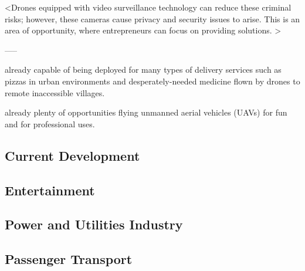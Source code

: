 <Drones equipped with video surveillance technology can reduce these criminal risks; however, these cameras cause privacy and security issues to arise. This is an area of opportunity, where entrepreneurs can focus on providing solutions. >

-----


already capable of being deployed for many types of delivery services 
such as pizzas in urban environments and 
desperately-needed medicine flown by drones to remote inaccessible villages.


already plenty of opportunities 
flying unmanned aerial vehicles (UAVs) for fun 
and for professional uses. %



\subsection{Current Development}



\subsection{Entertainment}


\subsection{Power and Utilities Industry}


\subsection{Passenger Transport}

